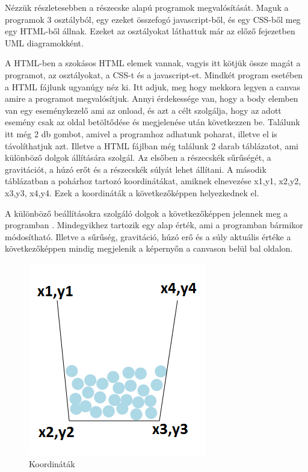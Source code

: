 


Nézzük részletesebben a részecske alapú programok megvalósítását. Maguk a programok 3 osztályból, egy ezeket összefogó javascript-ből, és egy CSS-ből meg egy HTML-ből állnak. Ezeket az osztályokat láthattuk már az előző fejezetben UML diagramokként.  


A HTML-ben a szokásos HTML elemek vannak, vagyis itt kötjük össze magát a programot, az osztályokat, a CSS-t és a javascript-et. Mindkét program esetében a HTML fájlunk ugyanúgy néz ki. Itt adjuk, meg hogy mekkora legyen a canvas amire a programot megvalósítjuk. Annyi érdekessége van, hogy a body elemben van egy eseménykezelő ami az onload, és azt a célt szolgálja, hogy az adott esemény csak az oldal betöltődése és megjelenése után következzen be.
Találunk itt még 2 db gombot, amivel a programhoz adhatunk poharat, illetve el is távolíthatjuk azt.
Illetve a HTML fájlban még találunk 2 darab táblázatot, ami különböző dolgok állítására szolgál. Az elsőben a részecskék sűrűségét, a gravitációt, a húzó erőt és a részecskék súlyát lehet állítani. 
A második táblázatban a pohárhoz tartozó koordinátákat, amiknek elnevezése x1,y1, x2,y2, x3,y3, x4,y4. Ezek a koordináták a következőképpen  helyezkednek el.

A különböző beállításokra szolgáló dolgok a következőképpen jelennek meg a programban . Mindegyikhez tartozik egy alap érték, ami a programban bármikor módosítható. Illetve a sűrűség, gravitáció, húzó erő és a súly aktuális értéke a következőképpen  mindig megjelenik a képernyőn a canvason belül bal oldalon. 

\begin{figure}[h]
	\centering
	\includegraphics[scale=1]{images/pohar.png}
	\caption{Koordináták}
	\label{fig:pohar}
\end{figure}

